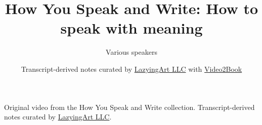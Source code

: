 \documentclass[11pt,oneside]{book}
\begin{document}
\frontmatter
\title{How You Speak and Write: How to speak with meaning}
\author{Various speakers}
\date{Transcript-derived notes curated by \href{https://lazying.art}{LazyingArt LLC} with \href{https://github.com/lachlanchen/Video2Book}{Video2Book}}
\maketitle
\begin{center}
\small Original video from the How You Speak and Write collection. Transcript-derived notes curated by \href{https://lazying.art}{LazyingArt LLC}.
\end{center}
\clearpage
\mainmatter

\end{document}
